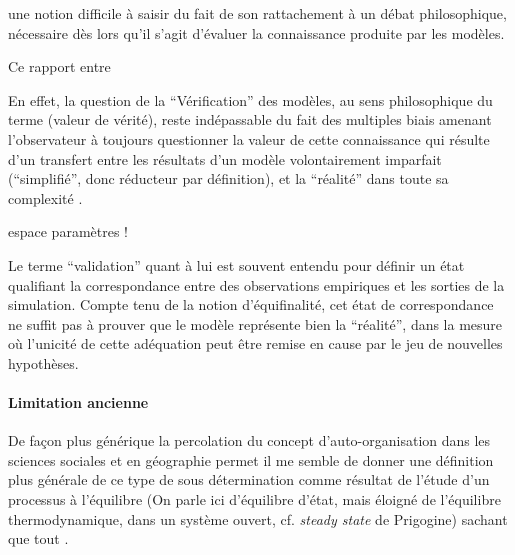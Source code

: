 une notion difficile à saisir du fait de son rattachement à un débat philosophique, nécessaire dès lors qu'il s'agit d'évaluer la connaissance produite par les modèles.

Ce rapport entre

En effet, la question de la \enquote{Vérification} des modèles, au sens philosophique du terme (valeur de vérité), reste indépassable du fait des multiples biais amenant l'observateur à toujours questionner la valeur de cette connaissance qui résulte d'un transfert entre les résultats d'un modèle volontairement imparfait (\enquote{simplifié}, donc réducteur par définition), et la \enquote{réalité} dans toute sa complexité \autocite{OSullivan2004}.


espace paramètres !

Le terme \enquote{validation} quant à lui est souvent entendu pour définir un état qualifiant la correspondance entre des observations empiriques et les sorties de la simulation. Compte tenu de la notion d'équifinalité, cet état de correspondance ne suffit pas à prouver que le modèle représente bien la \enquote{réalité}, dans la mesure où l’unicité de cette adéquation peut être remise en cause par le jeu de nouvelles hypothèses.

\paragraph{Limitation ancienne}


De façon plus générique la percolation du concept d'auto-organisation dans les sciences sociales et en géographie permet il me semble de donner une définition plus générale de ce type de sous détermination comme résultat de l'étude d'un processus à l'équilibre (On parle ici d'équilibre d'état, mais éloigné de l'équilibre thermodynamique, dans un système ouvert, cf. \textit{steady state} de Prigogine) sachant que tout .

